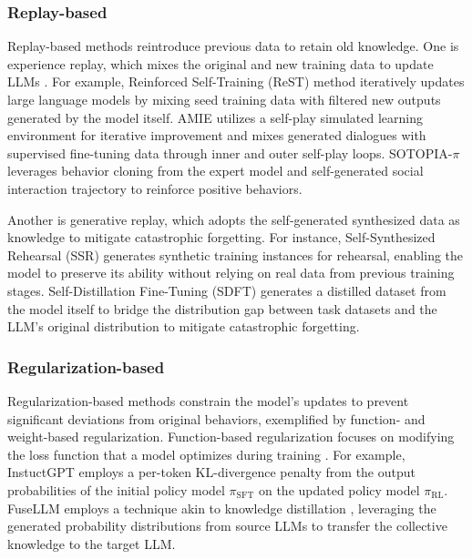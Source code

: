 \documentclass[sn-basic, Numbered]{sn-jnl}%
\theoremstyle{thmstyleone}%
\theoremstyle{thmstyletwo}%
\theoremstyle{thmstylethree}%
\begin{document}
\subsubsection{Replay-based} 
Replay-based methods reintroduce previous data to retain old knowledge. One is experience replay, which mixes the original and new training data to update LLMs \cite{roziere2023code, yang2024react, zheng2023self, lee2024llm2llm, wang2023adapting}. For example,  Reinforced Self-Training (ReST) \cite{gulcehre2023reinforced, aksitov2023rest} method iteratively updates large language models by mixing seed training data with filtered new outputs generated by the model itself. AMIE \cite{tu2024towards} utilizes a self-play simulated learning environment for iterative improvement and mixes generated dialogues with supervised fine-tuning data through inner and outer self-play loops. SOTOPIA-$\pi$ \cite{wang2024sotopia}  leverages behavior cloning from the expert model and self-generated social interaction trajectory to reinforce positive behaviors.

Another is generative replay, which adopts the self-generated synthesized data as knowledge to mitigate catastrophic forgetting. For instance, Self-Synthesized Rehearsal (SSR) \cite{huang2024mitigating} generates synthetic training instances for rehearsal, enabling the model to preserve its ability without relying on real data from previous training stages. Self-Distillation Fine-Tuning (SDFT) \cite{yang2024self} generates a distilled dataset from the model itself to bridge the distribution gap between task datasets and the LLM's original distribution to mitigate catastrophic forgetting.

\subsubsection{Regularization-based}
Regularization-based methods constrain the model's updates to prevent significant deviations from original behaviors, exemplified by function- and weight-based regularization. Function-based regularization focuses on modifying the loss function that a model optimizes during training \cite{zhong2023self, peng2023token}. For example, InstuctGPT \cite{ouyang2022training} employs a per-token KL-divergence penalty from the output probabilities of the initial policy model $\pi_\text{SFT}$ on the updated policy model $\pi_\text{RL}$. FuseLLM \cite{wan2024knowledge} employs a technique akin to knowledge distillation \cite{hinton2015distilling}, leveraging the generated probability distributions from source LLMs to transfer the collective knowledge to the target LLM.
\end{document}
